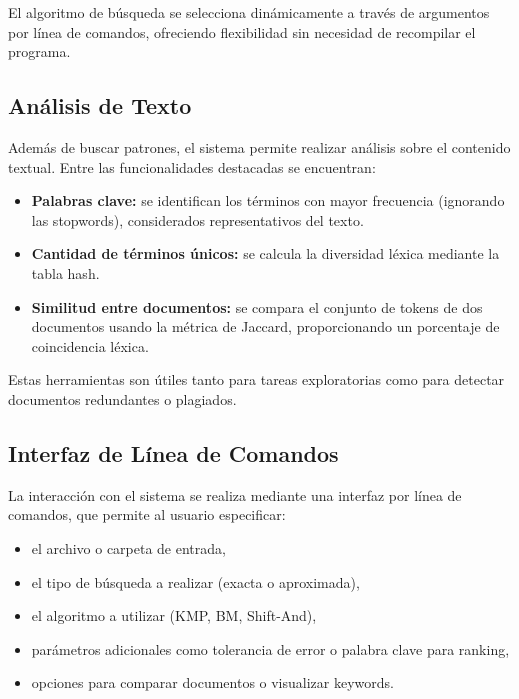 \documentclass[9pt,letterpaper,onecolumn]{rho-class/rho}
\begin{document}
El algoritmo de búsqueda se selecciona dinámicamente a través de argumentos por línea de comandos, ofreciendo flexibilidad sin necesidad de recompilar el programa.

\subsection{Análisis de Texto}

Además de buscar patrones, el sistema permite realizar análisis sobre el contenido textual. Entre las funcionalidades destacadas se encuentran:

\begin{itemize}
    \item \textbf{Palabras clave:} se identifican los términos con mayor frecuencia (ignorando las stopwords), considerados representativos del texto.
    \item \textbf{Cantidad de términos únicos:} se calcula la diversidad léxica mediante la tabla hash.
    \item \textbf{Similitud entre documentos:} se compara el conjunto de tokens de dos documentos usando la métrica de Jaccard, proporcionando un porcentaje de coincidencia léxica.
\end{itemize}

Estas herramientas son útiles tanto para tareas exploratorias como para detectar documentos redundantes o plagiados.

\subsection{Interfaz de Línea de Comandos}

La interacción con el sistema se realiza mediante una interfaz por línea de comandos, que permite al usuario especificar:

\begin{itemize}
    \item el archivo o carpeta de entrada,
    \item el tipo de búsqueda a realizar (exacta o aproximada),
    \item el algoritmo a utilizar (KMP, BM, Shift-And),
    \item parámetros adicionales como tolerancia de error o palabra clave para ranking,
    \item opciones para comparar documentos o visualizar keywords.
\end{itemize}
\end{document}

